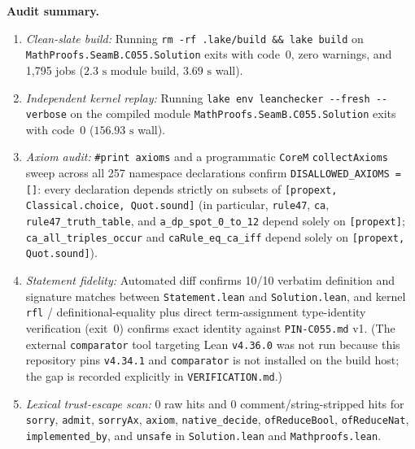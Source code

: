 \documentclass[11pt]{article}
\theoremstyle{definition}
\begin{document}
\noindent\textbf{Audit summary.}
\begin{enumerate}\setlength{\itemsep}{2pt}
\item \emph{Clean-slate build:} Running \texttt{rm -rf .lake/build \&\& lake build} on \nolinkurl{MathProofs.SeamB.C055.Solution} exits with code~$0$, zero warnings, and 1{,}795 jobs ($2.3\text{ s}$ module build, $3.69\text{ s}$ wall).
\item \emph{Independent kernel replay:} Running \texttt{lake env leanchecker -{}-fresh -{}-verbose} on the compiled module \nolinkurl{MathProofs.SeamB.C055.Solution} exits with code~$0$ ($156.93\text{ s}$ wall).
\item \emph{Axiom audit:} \texttt{\#print axioms} and a programmatic \texttt{CoreM} \texttt{collectAxioms} sweep across all 257 namespace declarations confirm \texttt{DISALLOWED\_AXIOMS = []}: every declaration depends strictly on subsets of \texttt{[propext, Classical.choice, Quot.sound]} (in particular, \texttt{rule47}, \texttt{ca}, \texttt{rule47\_truth\_table}, and \texttt{a\_dp\_spot\_0\_to\_12} depend solely on \texttt{[propext]}; \texttt{ca\_all\_triples\_occur} and \texttt{caRule\_eq\_ca\_iff} depend solely on \texttt{[propext, Quot.sound]}).
\item \emph{Statement fidelity:} Automated diff confirms 10/10 verbatim definition and signature matches between \texttt{Statement.lean} and \texttt{Solution.lean}, and kernel \texttt{rfl} / definitional-equality plus direct term-assignment type-identity verification (exit~$0$) confirms exact identity against \texttt{PIN-C055.md} v1. (The external \texttt{comparator} tool targeting Lean \texttt{v4.36.0} was not run because this repository pins \texttt{v4.34.1} and \texttt{comparator} is not installed on the build host; the gap is recorded explicitly in \texttt{VERIFICATION.md}.)
\item \emph{Lexical trust-escape scan:} $0$ raw hits and $0$ comment/string-stripped hits for \texttt{sorry}, \texttt{admit}, \texttt{sorryAx}, \texttt{axiom}, \texttt{native\_decide}, \texttt{ofReduceBool}, \texttt{ofReduceNat}, \texttt{implemented\_by}, and \texttt{unsafe} in \texttt{Solution.lean} and \texttt{Mathproofs.lean}.
\end{enumerate}
\end{document}
